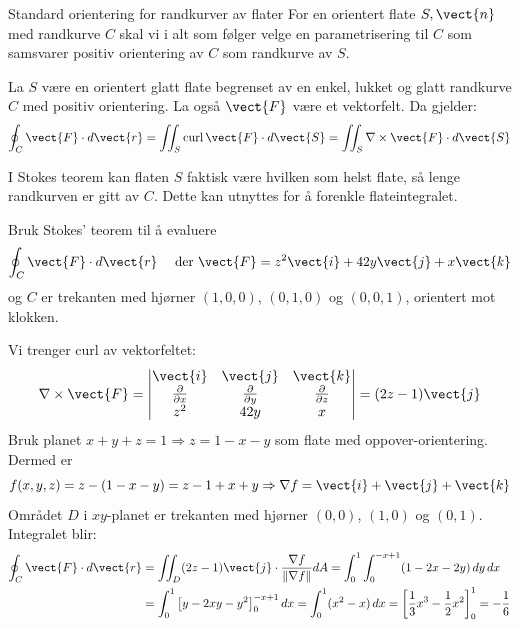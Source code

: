 \begin{oppsum}{Standard orientering for randkurver av flater}
For en orientert flate $S,\vect{n}$ med randkurve $C$ skal vi i alt som følger velge en parametrisering til $C$ som samsvarer positiv orientering av $C$ som randkurve av $S$. 
\end{oppsum}

\begin{thm}\label{thm:stokes}
La $S$ være en orientert glatt flate begrenset av en enkel, lukket og glatt randkurve $C$ med positiv orientering. La også $\vect{F}$ være et vektorfelt. Da gjelder:
\[
\oint_C \vect{F} \cdot d\vect{r} =\iint_S \operatorname{curl} \vect{F} \cdot d\vect{S} = \iint_S \nabla \times \vect{F} \cdot d\vect{S}
\]
\end{thm}
I Stokes teorem kan flaten $S$ faktisk være hvilken som helst flate, så lenge randkurven er gitt av $C$. Dette kan utnyttes for å forenkle flateintegralet.


\begin{eks}{}
Bruk Stokes’ teorem til å evaluere
\[
\oint_C \vect{F} \cdot d\vect{r} \quad \text{ der } \vect{F} = z^2 \vect{i} + 42y \vect{j} + x \vect{k}
\]
og $C$ er trekanten med hjørner $(1, 0, 0)$, $(0, 1, 0)$ og $(0, 0, 1)$, orientert mot klokken.

Vi trenger curl av vektorfeltet:
\[
\nabla \times \vect{F} = \begin{vmatrix}
\vect{i} & \vect{j} & \vect{k} \\
\frac{\partial}{\partial x} & \frac{\partial}{\partial y} & \frac{\partial}{\partial z} \\
z^2 & 42y & x
\end{vmatrix}
= (2z - 1)\vect{j}
\]
Bruk planet $x + y + z = 1 \Rightarrow z = 1 - x - y$ som flate med oppover-orientering. Dermed er 
\[
f(x, y, z) = z - (1 - x - y) = z - 1 + x + y
\Rightarrow \nabla f = \vect{i} + \vect{j} + \vect{k}
\]
Området $D$ i $xy$-planet er trekanten med hjørner $(0,0)$, $(1,0)$ og $(0,1)$.
Integralet blir:
\begin{align*}
\oint_C \vect{F} \cdot d\vect{r}
&= \iint_D (2z - 1) \vect{j} \cdot \frac{\nabla f}{\|\nabla f\|} dA
= \int_0^1 \int_0^{-x + 1} (1 - 2x - 2y) \, dy \, dx\\
&= \int_0^1 \left[ y - 2xy - y^2 \right]_0^{-x+1} dx
= \int_0^1 (x^2 - x) \, dx
= \left[\frac{1}{3}x^3 - \frac{1}{2}x^2 \right]_0^1
= -\frac{1}{6}
\end{align*}
\end{eks}

